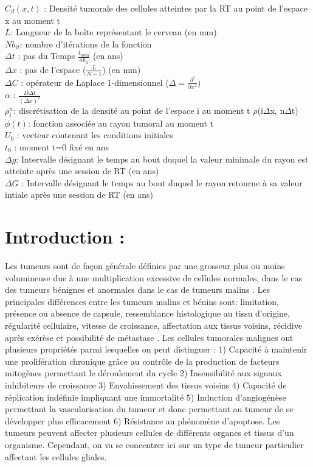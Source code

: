 \documentclass[12pt,a4paper]{article}
\begin{document}
\textbf{$C_d(x,t)$} : Densité tumorale des cellules atteintes par la RT au point de l'espace x au moment t\\
\textbf{$L$}: Longueur de la boîte représentant le cerveau (en mm)\\
\textbf{$Nb_{it}$}: nombre d'itérations de la fonction\\
\textbf{$\Delta t$} : pas du Temps $\frac{t_{total}}{nb_{it}}$ (en ans) \\
\textbf{$\Delta x$} : pas de l'espace ($\frac{L}{N-1}$) (en mm)\\
\textbf{$\Delta C$} : opérateur de Laplace 1-dimensionnel ($\Delta = \frac{\partial^2}{\partial x^2})$ \\
\textbf{$\alpha$} : $\frac{D \Delta t}{(\Delta x)^2}$\\
\textbf{$\rho^n_i $}: discrétisation de la densité au point de l'espace i au moment t $\rho$(i$\Delta$x, n$\Delta$t)\\
\textbf{$\phi(t)$}: fonction associée au rayon tumoral au moment t\\
\textbf{$U_0$} : vecteur contenant les conditions initiales \\
\textbf{$t_0$} : moment t=0 fixé en ans \\
\textbf{$\Delta g$}: Intervalle désignant le temps au bout duquel la valeur minimale du rayon est atteinte après une session de RT (en ans)\\
\textbf{$\Delta G$} : Intervalle désignant le temps au bout duquel le rayon retourne à sa valeur intiale après une session de RT (en ans)\\


\newpage
\tableofcontents
\newpage
\singlespacing

\section{Introduction :}

Les tumeurs sont de façon générale définies par une grosseur plus ou moins volumineuse due à une multiplication excessive de cellules normales, dans le cas des tumeurs bénignes et anormales dans le cas de tumeurs malins \cite{a} .  Les principales différences entre les tumeurs malins et bénins sont: limitation, présence ou absence de capsule, ressemblance histologique au tissu d’origine, régularité cellulaire, vitesse de croissance, affectation aux tissus voisins, récidive après exérèse et possibilité de métastase \cite{b} .  Les cellules tumorales malignes ont plusieurs propriétés parmi lesquelles on peut distinguer \cite{c} : 1) Capacité à maintenir une prolifération chronique grâce au contrôle de la production de facteurs mitogènes permettant le déroulement du cycle 2) Insensibilité aux signaux inhibiteurs de croissance 3) Envahissement des tissus voisins 4) Capacité de réplication indéfinie impliquant une immortalité 5) Induction d’angiogénèse permettant la vascularisation du tumeur et donc permettant au tumeur de se développer plus efficacement 6) Résistance au phénomène d’apoptose. 
Les tumeurs peuvent affecter plusieurs cellules de différents organes et tissus d’un organisme.   Cependant, on va se concentrer ici sur un type de tumeur particulier affectant les cellules gliales. \\ 
\end{document}
